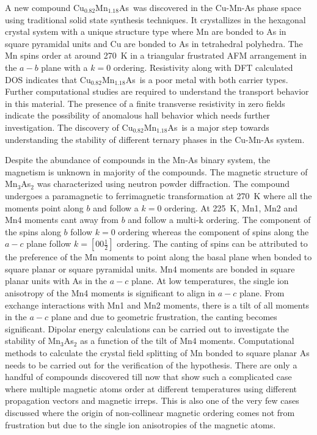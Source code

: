 \documentclass[letterpaper,10pt,doublespacing,edeposit]{uiucthesis2020}
\newcommand*{\cumnas}{Cu$_{0.82}$Mn$_{1.18}$As}
\begin{document}
\begin{mainmatter}
A new compound \cumnas\ was discovered in the Cu-Mn-As phase space using traditional solid state synthesis techniques. It crystallizes in the hexagonal crystal system with a unique structure type where Mn are bonded to As in square pyramidal units and Cu are bonded to As in tetrahedral polyhedra. The Mn spins order at around 270~K in a triangular frustrated AFM arrangement in the $a-b$ plane with a $k=0$ ordering. Resistivity along with DFT calculated DOS indicates that \cumnas\ is a poor metal with both carrier types. Further computational studies are required to understand the transport behavior in this material. The presence of a finite transverse resistivity in zero fields indicate the possibility of anomalous hall behavior which needs further investigation. The discovery of \cumnas\ is a major step towards understanding the stability of different ternary phases in the Cu-Mn-As system.

Despite the abundance of compounds in the Mn-As binary system, the magnetism is unknown in majority of the compounds. The magnetic structure of Mn$_3$As$_2$ was characterized using neutron powder diffraction. The compound undergoes a paramagnetic to ferrimagnetic transformation at 270~K where all the moments point along $b$ and follow a $k=0$ ordering. At 225~K, Mn1, Mn2 and Mn4 moments cant away from $b$ and follow a multi-k ordering. The component of the spins along $b$ follow $k=0$ ordering whereas the component of spins along the $a-c$ plane follow $k=[00\frac{1}{2}]$ ordering. The canting of  spins can be attributed to the preference of the Mn moments to point along the basal plane when bonded to square planar or square pyramidal units. Mn4 moments are bonded in square planar units with As in the $a-c$ plane. At low temperatures, the single ion anisotropy of the Mn4 moments is significant to align in $a-c$ plane. From exchange interactions with Mn1 and Mn2 moments, there is a tilt of all moments in the $a-c$ plane and due to geometric frustration, the canting becomes significant. Dipolar energy calculations can be carried out to investigate the stability of Mn$_3$As$_2$ as a function of the tilt of Mn4 moments. Computational methods to calculate the crystal field splitting of Mn bonded to square planar As needs to be carried out for the verification of the hypothesis. There are only a handful of compounds discovered till now that show such a complicated case where multiple magnetic atoms order at different temperatures using different propagation vectors and magnetic irreps. This is also one of the very few cases discussed where the origin of non-collinear magnetic ordering comes not from frustration but due to the single ion anisotropies of the magnetic atoms.


\end{mainmatter}
\end{document}
